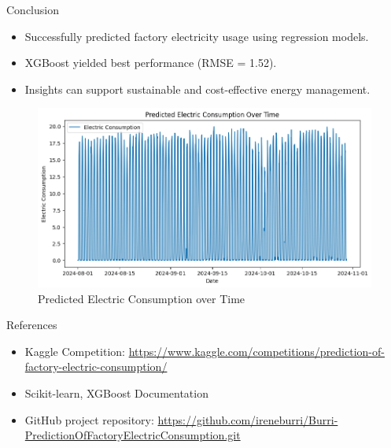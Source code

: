 \documentclass{beamer}
\begin{document}
\begin{frame}{Conclusion}
  \begin{itemize}
    \item Successfully predicted factory electricity usage using regression models.
    \item XGBoost yielded best performance (RMSE = 1.52).
    \item Insights can support sustainable and cost-effective energy management.
  \end{itemize}
    \begin{figure}
\vfill
    \centering
    \includegraphics[width=0.5\linewidth]{images/predictedEC.png}
    \caption{Predicted Electric Consumption over Time}
    \label{fig:enter-label}
\end{figure}
\end{frame}

\begin{frame}{References}
  \begin{itemize}
    \item Kaggle Competition: \url{https://www.kaggle.com/competitions/prediction-of-factory-electric-consumption/}
    \item Scikit-learn, XGBoost Documentation
    \item GitHub project repository: \url{https://github.com/ireneburri/Burri-PredictionOfFactoryElectricConsumption.git}
  \end{itemize}
\end{frame}
\end{document}
